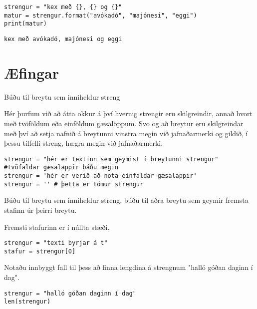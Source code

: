 \begin{lstlisting}[caption=Aðferðin .format() kynnt, label=lst:str-format]
strengur = "kex með {}, {} og {}"
matur = strengur.format("avókadó", "majónesi", "eggi")
print(matur)
\end{lstlisting}
\lstset{style=uttak}
\begin{lstlisting}
kex með avókadó, majónesi og eggi
\end{lstlisting}
\lstset{style=venjulegt}
\newpage
\section{Æfingar}
\begin{exercise}\label{str1}
	Búðu til breytu sem inniheldur streng
\end{exercise}
\begin{Answer}[ref={str1}]
	Hér þurfum við að átta okkur á því hvernig strengir eru skilgreindir, annað hvort með tvöföldum eða einföldum gæsalöppum.
	Svo og að breytur eru skilgreindar með því að setja nafnið á breytunni vinstra megin við jafnaðarmerki og gildið, í þessu tilfelli streng, hægra megin við jafnaðarmerki.
	\begin{lstlisting}
strengur = "hér er textinn sem geymist í breytunni strengur" #tvöfaldar gæsalappir báðu megin
strengur = 'hér er verið að nota einfaldar gæsalappir'
strengur = '' # þetta er tómur strengur\end{lstlisting}
\end{Answer}

\begin{exercise}\label{str2}
	Búðu til breytu sem inniheldur streng, búðu til aðra breytu sem geymir fremsta stafinn úr þeirri breytu.
\end{exercise}
\begin{Answer}[ref={str2}]
	Fremsti stafurinn er í núllta stæði.
	\begin{lstlisting}
strengur = "texti byrjar á t"
stafur = strengur[0]\end{lstlisting}
\end{Answer}

\begin{exercise}\label{str3}
	Notaðu innbyggt fall til þess að finna lengdina á strengnum "halló góðan daginn í dag".
\end{exercise}
\begin{Answer}[ref={str3}]
	\begin{lstlisting}
strengur = "halló góðan daginn í dag"
len(strengur)\end{lstlisting}
\end{Answer}

